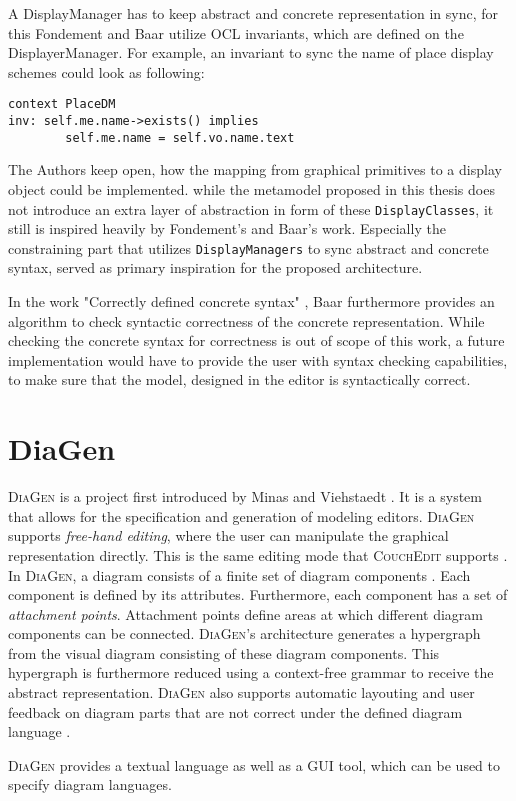 A DisplayManager has to keep abstract and concrete representation in sync, for this Fondement and Baar utilize OCL invariants, which are defined on the DisplayerManager. For example, an invariant to sync the name of place display schemes could look as following:

\begin{lstlisting}[language=OCL,captionpos=b,caption={OCL Invariant that syncs the name attribute of \texttt{DisplayClass} and model element.}]
context PlaceDM
inv: self.me.name->exists() implies
        self.me.name = self.vo.name.text
\end{lstlisting}

The Authors keep open, how the mapping from graphical primitives to a display object could be implemented. while the metamodel proposed in this thesis does not introduce an extra layer of abstraction in form of these \texttt{DisplayClasses}, it still is inspired heavily by Fondement's and Baar's work. Especially the constraining part that utilizes \texttt{DisplayManagers} to sync abstract and concrete syntax, served as primary inspiration for the proposed architecture.

In the work "Correctly defined concrete syntax" \cite{baar_correctly_2008}, Baar furthermore provides an algorithm to check syntactic correctness of the concrete representation. While checking the concrete syntax for correctness is out of scope of this work, a future implementation would have to provide the user with syntax checking capabilities, to make sure that the model, designed in the editor is syntactically correct.


\section{DiaGen}
\label{diagen}
\textsc{DiaGen} is a project first introduced by Minas and Viehstaedt \cite{minas_diagen_1995}. It is a system that allows for the specification and generation of modeling editors. \textsc{DiaGen} supports \emph{free-hand editing}, where the user can manipulate the graphical representation directly. This is the same editing mode that \textsc{CouchEdit} supports \cite{nachreiner_couchedit_2020}. In \textsc{DiaGen}, a diagram consists of a finite set of diagram components \cite{minas_concepts_2002}. Each component is defined by its attributes. Furthermore, each component has a set of \emph{attachment points}. Attachment points define areas at which different diagram components can be connected. \textsc{DiaGen}'s architecture generates a hypergraph from the visual diagram consisting of these diagram components. This hypergraph is furthermore reduced using a context-free grammar to receive the abstract representation. \textsc{DiaGen} also supports automatic layouting and user feedback on diagram parts that are not correct under the defined diagram language \cite{minas_concepts_2002}.

\textsc{DiaGen} provides a textual language as well as a GUI tool, which can be used to specify diagram languages. 


